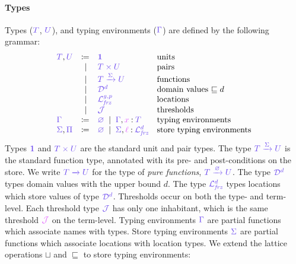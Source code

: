 \documentclass[main.tex]{subfiles}
\begin{document}
\paragraph*{Types}
Types ($\ty{T}$, $\ty{U}$),  and typing environments ($\ty{\Gamma}$) are defined by the following grammar:
\[
\begin{array}{lrll}
  \ty{T}, \ty{U}
  & \coloneqq & \ty{\tyunit}                              & \text{units}\\
  & \sep      & \ty{\typrod{T}{U}}                        & \text{pairs}\\
  & \sep      & \ty{\tyfun[\ty{\Sigma}]{T}{U}}            & \text{functions}\\
  & \sep      & \ty{\tyD{d}}                              & \text{domain values }{\sqsubseteq d}\\
  & \sep      & \ty{\tyL{\frz}{g,p}}                      & \text{locations}\\
  & \sep      & \ty{\tyJ}                                 & \text{thresholds}
  \\
  \ty{\Gamma}
  & \coloneqq & \ty{\envemp}
    \sep        \envext{\ty{\Gamma}}{x}{T}                & \text{typing environments}
  \\
  \ty{\Sigma},\ty{\Pi}
  & \coloneqq & \ty{\envemp}
    \sep        \envext{\ty{\Sigma}}{\ell}{\tyL{\frz}{d}} & \text{store typing environments}
\end{array}
\]
Types $\ty{\tyunit}$ and $\ty{\typrod{T}{U}}$ are the standard unit and pair types.
The type $\ty{\tyfun[\ty{\Sigma}]{T}{U}}$ is the standard function type, annotated with its pre- and post-conditions on the store. We write $\ty{\tyfun{T}{U}}$ for the type of \emph{pure functions}, \ie $\ty{\tyfun[\envemp]{T}{U}}$.
The type $\tyD{d}$ types domain values with the upper bound $d$.
The type $\tyL{\frz}{d}$ types locations which store values of type $\tyD{d}$.
Thresholds occur on both the type- and term-level. Each threshold type $\tyJ$ has only one inhabitant, which is the same threshold $\tmJ$ on the term-level.
Typing environments $\ty{\Gamma}$ are partial functions which associate names with types.
Store typing environments $\ty{\Sigma}$ are partial functions which associate locations with location types.
We extend the lattice operations $\sqcup$ and $\sqsubseteq$ to store typing environments:
\end{document}
